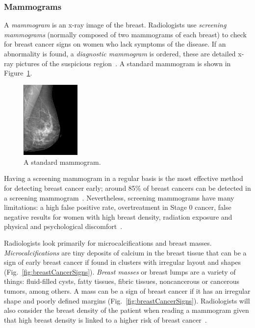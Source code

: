 \subsubsection{Mammograms}
A \emph{mammogram} is an x-ray image of the breast. Radiologists use \emph{screening mammograms} (normally composed of two mammograms of each breast) to check for breast cancer signs on women who lack symptoms of the disease. If an abnormality is found, a \emph{diagnostic mammogram} is ordered, these are detailed x-ray pictures of the suspicious region~\cite{NCI2014}. A standard mammogram is shown in Figure~\ref{fig:normalMammogram}.

\begin{figure}[h]
	\centering
	\includegraphics[width = 0.26\textwidth]{plots/normalMammogram.jpg}
	\caption[A digital mammogram]{A standard mammogram.}
	\label{fig:normalMammogram}
\end{figure}

Having a screening mammogram in a regular basis is the most effective method for detecting breast cancer early; around 85\% of breast cancers can be detected in a screening mammogram~\cite{BCSC2013}. Nevertheless, screening mammograms have many limitations: a high false positive rate, overtreatment in Stage 0 cancer, false negative results for women with high breast density, radiation exposure and physical and psychological discomfort~\cite{NCI2014}.

Radiologists look primarily for microcalcifications and breast masses. \emph{Microcalcifications} are tiny deposits of calcium in the breast tissue that can be a sign of early breast cancer if found in clusters with irregular layout and shapes (Fig.~\ref{fig:breastCancerSigns}). \emph{Breast masses} or breast lumps are a variety of things: fluid-filled cysts, fatty tissues, fibric tissues, noncancerous or cancerous tumors, among others. A mass can be a sign of breast cancer if it has an irregular shape and poorly defined margins (Fig.~\ref{fig:breastCancerSigns}). Radiologists will also consider the breast density of the patient when reading a mammogram given that high breast density is linked to a higher risk of breast cancer~\cite{ACS2014}.

